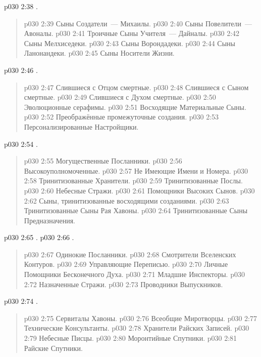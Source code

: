 \vs p030 2:38 .
\begin{quote}
\vs p030 2:39 Сыны Создатели~--- Михаилы.
\vs p030 2:40 Сыны Повелители~--- Авоналы.
\vs p030 2:41 Троичные Сыны Учителя~--- Дайналы.
\vs p030 2:42 Сыны Мелхиседеки.
\vs p030 2:43 Сыны Ворондадеки.
\vs p030 2:44 Сыны Ланонандеки.
\vs p030 2:45 Сыны Носители Жизни.
\end{quote}
\vs p030 2:46 .
\begin{quote}
\vs p030 2:47 Слившиеся с Отцом смертные.
\vs p030 2:48 Слившиеся с Сыном смертные.
\vs p030 2:49 Слившиеся с Духом смертные.
\vs p030 2:50 Эволюционные серафимы.
\vs p030 2:51 Восходящие Материальные Сыны.
\vs p030 2:52 Преображённые промежуточные создания.
\vs p030 2:53 Персонализированные Настройщики.
\end{quote}
\vs p030 2:54 .
\begin{quote}
\vs p030 2:55 Могущественные Посланники.
\vs p030 2:56 Высокоуполномоченные.
\vs p030 2:57 Не Имеющие Имени и Номера.
\vs p030 2:58 Тринитизованные Хранители.
\vs p030 2:59 Тринитизованные Послы.
\vs p030 2:60 Небесные Стражи.
\vs p030 2:61 Помощники Высоких Сынов.
\vs p030 2:62 Сыны, тринитизованные восходящими созданиями.
\vs p030 2:63 Тринитизованные Сыны Рая Хавоны.
\vs p030 2:64 Тринитизованные Сыны Предназначения.
\end{quote}
\vs p030 2:65 .
\vs p030 2:66 .
\begin{quote}
\vs p030 2:67 Одинокие Посланники.
\vs p030 2:68 Смотрители Вселенских Контуров.
\vs p030 2:69 Управляющие Переписью.
\vs p030 2:70 Личные Помощники Бесконечного Духа.
\vs p030 2:71 Младшие Инспекторы.
\vs p030 2:72 Назначенные Стражи.
\vs p030 2:73 Проводники Выпускников.
\end{quote}
\vs p030 2:74 .
\begin{quote}
\vs p030 2:75 Сервиталы Хавоны.
\vs p030 2:76 Всеобщие Миротворцы.
\vs p030 2:77 Технические Консультанты.
\vs p030 2:78 Хранители Райских Записей.
\vs p030 2:79 Небесные Писцы.
\vs p030 2:80 Моронтийные Спутники.
\vs p030 2:81 Райские Спутники.
\end{quote}
